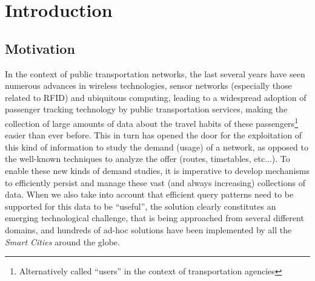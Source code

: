 \documentclass[a4paper,10pt,twoside]{book}
\begin{document}
\pagestyle{fancy}\fancyfoot{}\fancyhead{}
\fancyhead[LO]{\slshape\nouppercase{\rightmark}}
\fancyhead[RE]{\slshape\nouppercase{\leftmark}}
\fancyhead[RO,LE]{\slshape \thepage}

\frontmatter




\mainmatter

\chapter{Introduction}
	\section{Motivation}
	In the context of public transportation networks, the last several years have seen numerous advances in wireless technologies, sensor networks (especially those related to RFID) and ubiquitous computing, leading to a widespread adoption of passenger tracking technology by public transportation services, making the collection of large amounts of data about the travel habits of these passengers\footnote{Alternatively called ``users'' in the context of transportation agencies} easier than ever before.
	This in turn has opened the door for the exploitation of this kind of information to study the demand (usage) of a network, as opposed to the well-known techniques to analyze the offer (routes, timetables, etc...). 
	To enable these new kinds of demand studies, it is imperative to develop mechanisms to efficiently persist and manage these vast (and always increasing) collections of data. When we also take into account that efficient query patterns need to be supported for this data to be ``useful'', the solution clearly constitutes an emerging technological challenge, that is being approached from several different domains, and hundreds of ad-hoc solutions have been implemented by all the \textit{Smart Cities} around the globe.
	
\end{document}
